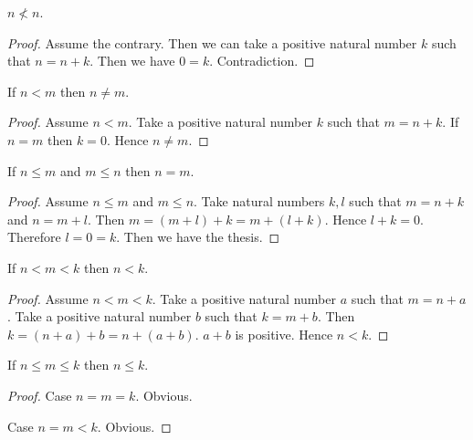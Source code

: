 \documentclass[../../arithmetic.tex]{subfiles}
\begin{document}
  \begin{forthel}
    \begin{proposition}\label{Arithmetic_02_01_659871}
      $n \nless n$.
    \end{proposition}
    \begin{proof}
      Assume the contrary.
      Then we can take a positive natural number $k$ such that $n = n + k$.
      Then we have $0 = k$.
      Contradiction.
    \end{proof}


    \begin{proposition}\label{Arithmetic_02_01_679789}
      If $n < m$ then $n \neq m$.
    \end{proposition}
    \begin{proof}
      Assume $n < m$.
      Take a positive natural number $k$ such that $m = n + k$.
      If $n = m$ then $k = 0$.
      Hence $n \neq m$.
    \end{proof}


    \begin{proposition}\label{Arithmetic_02_01_710123}
      If $n \leq m$ and $m \leq n$ then $n = m$.
    \end{proposition}
    \begin{proof}
      Assume $n \leq m$ and $m \leq n$.
      Take natural numbers $k,l$ such that $m = n + k$ and $n = m + l$.
      Then $m = (m + l) + k = m + (l + k)$.
      Hence $l + k = 0$.
      Therefore $l = 0 = k$.
      Then we have the thesis.
    \end{proof}


    \begin{proposition}\label{Arithmetic_02_01_662806}
      If $n < m < k$ then $n < k$.
    \end{proposition}
    \begin{proof}
      Assume $n < m < k$.
      Take a positive natural number $a$ such that $m = n + a$.
      Take a positive natural number $b$ such that $k = m + b$.
      Then $k = (n + a) + b = n + (a + b)$.
      $a + b$ is positive.
      Hence $n < k$.
    \end{proof}


    \begin{proposition}\label{Arithmetic_02_01_394529}
      If $n \leq m \leq k$ then $n \leq k$.
    \end{proposition}
    \begin{proof}
      Case $n = m = k$. Obvious.

      Case $n = m < k$. Obvious.


\end{proof}
\end{forthel}
\end{document}
